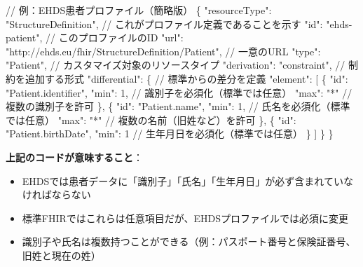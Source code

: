 \documentclass[
  a4paper,
  a4paper,
  11pt]{ltjsbook}
\newenvironment{Shaded}{\begin{snugshade}}{\end{snugshade}}
\newcommand{\DataTypeTok}[1]{\textcolor[rgb]{0.68,0.00,0.00}{#1}}
\newcommand{\DecValTok}[1]{\textcolor[rgb]{0.68,0.00,0.00}{#1}}
\newcommand{\ErrorTok}[1]{\textcolor[rgb]{0.68,0.00,0.00}{#1}}
\newcommand{\FunctionTok}[1]{\textcolor[rgb]{0.28,0.35,0.67}{#1}}
\newcommand{\OtherTok}[1]{\textcolor[rgb]{0.00,0.23,0.31}{#1}}
\newcommand{\StringTok}[1]{\textcolor[rgb]{0.13,0.47,0.30}{#1}}
\providecommand{\tightlist}{%
  \setlength{\itemsep}{0pt}\setlength{\parskip}{0pt}}
\begin{document}
\begin{Shaded}
\begin{Highlighting}[]
\ErrorTok{//} \ErrorTok{例：EHDS患者プロファイル（簡略版）}
\FunctionTok{\{}
  \DataTypeTok{"resourceType"}\FunctionTok{:} \StringTok{"StructureDefinition"}\FunctionTok{,}  \ErrorTok{//} \ErrorTok{これがプロファイル定義であることを示す}
  \DataTypeTok{"id"}\FunctionTok{:} \StringTok{"ehds{-}patient"}\FunctionTok{,}                    \ErrorTok{//} \ErrorTok{このプロファイルのID}
  \DataTypeTok{"url"}\FunctionTok{:} \StringTok{"http://ehds.eu/fhir/StructureDefinition/Patient"}\FunctionTok{,}  \ErrorTok{//} \ErrorTok{一意のURL}
  \DataTypeTok{"type"}\FunctionTok{:} \StringTok{"Patient"}\FunctionTok{,}                       \ErrorTok{//} \ErrorTok{カスタマイズ対象のリソースタイプ}
  \DataTypeTok{"derivation"}\FunctionTok{:} \StringTok{"constraint"}\FunctionTok{,}              \ErrorTok{//} \ErrorTok{制約を追加する形式}
  \DataTypeTok{"differential"}\FunctionTok{:} \FunctionTok{\{}                        \ErrorTok{//} \ErrorTok{標準からの差分を定義}
    \DataTypeTok{"element"}\FunctionTok{:} \OtherTok{[}
      \FunctionTok{\{}
        \DataTypeTok{"id"}\FunctionTok{:} \StringTok{"Patient.identifier"}\FunctionTok{,}
        \DataTypeTok{"min"}\FunctionTok{:} \DecValTok{1}\FunctionTok{,}  \ErrorTok{//} \ErrorTok{識別子を必須化（標準では任意）}
        \DataTypeTok{"max"}\FunctionTok{:} \StringTok{"*"} \ErrorTok{//} \ErrorTok{複数の識別子を許可}
      \FunctionTok{\}}\OtherTok{,}
      \FunctionTok{\{}
        \DataTypeTok{"id"}\FunctionTok{:} \StringTok{"Patient.name"}\FunctionTok{,}
        \DataTypeTok{"min"}\FunctionTok{:} \DecValTok{1}\FunctionTok{,}  \ErrorTok{//} \ErrorTok{氏名を必須化（標準では任意）}
        \DataTypeTok{"max"}\FunctionTok{:} \StringTok{"*"} \ErrorTok{//} \ErrorTok{複数の名前（旧姓など）を許可}
      \FunctionTok{\}}\OtherTok{,}
      \FunctionTok{\{}
        \DataTypeTok{"id"}\FunctionTok{:} \StringTok{"Patient.birthDate"}\FunctionTok{,}
        \DataTypeTok{"min"}\FunctionTok{:} \DecValTok{1}   \ErrorTok{//} \ErrorTok{生年月日を必須化（標準では任意）}
      \FunctionTok{\}}
    \OtherTok{]}
  \FunctionTok{\}}
\FunctionTok{\}}
\end{Highlighting}
\end{Shaded}

\textbf{上記のコードが意味すること}：

\begin{itemize}
\tightlist
\item
  EHDSでは患者データに「識別子」「氏名」「生年月日」が必ず含まれていなければならない
\item
  標準FHIRではこれらは任意項目だが、EHDSプロファイルでは必須に変更
\item
  識別子や氏名は複数持つことができる（例：パスポート番号と保険証番号、旧姓と現在の姓）
\end{itemize}
\end{document}
